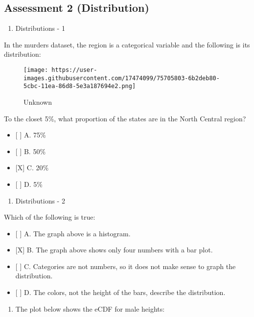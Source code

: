 \documentclass[]{article}
\providecommand{\tightlist}{%
  \setlength{\itemsep}{0pt}\setlength{\parskip}{0pt}}
\begin{document}
\hypertarget{assessment-2-distribution}{%
\subsection{Assessment 2
(Distribution)}\label{assessment-2-distribution}}

\begin{enumerate}
\def\labelenumi{\arabic{enumi}.}
\tightlist
\item
  Distributions - 1
\end{enumerate}

In the murders dataset, the region is a categorical variable and the
following is its distribution:

\begin{figure}
\centering
\texttt{[image: https://user-images.githubusercontent.com/17474099/75705803-6b2deb80-5cbc-11ea-86d8-5e3a187694e2.png]}
\caption{Unknown}
\end{figure}

To the closet 5\%, what proportion of the states are in the North
Central region?

\begin{itemize}
\tightlist
\item
  {[} {]} A. 75\%
\item
  {[} {]} B. 50\%
\item
  {[}X{]} C. 20\%
\item
  {[} {]} D. 5\%
\end{itemize}

\begin{enumerate}
\def\labelenumi{\arabic{enumi}.}
\setcounter{enumi}{1}
\tightlist
\item
  Distributions - 2
\end{enumerate}

Which of the following is true:

\begin{itemize}
\tightlist
\item
  {[} {]} A. The graph above is a histogram.
\item
  {[}X{]} B. The graph above shows only four numbers with a bar plot.
\item
  {[} {]} C. Categories are not numbers, so it does not make sense to
  graph the distribution.
\item
  {[} {]} D. The colors, not the height of the bars, describe the
  distribution.
\end{itemize}

\begin{enumerate}
\def\labelenumi{\arabic{enumi}.}
\setcounter{enumi}{2}
\tightlist
\item
  The plot below shows the eCDF for male heights:
\end{enumerate}
\end{document}
